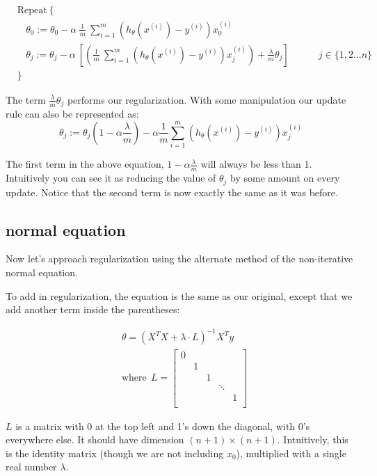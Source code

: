 \documentclass[10pt,a4paper,UTF8]{article}
\begin{document}
\begin{align*} & \text{Repeat}\ \lbrace \\ & \ \ \ \ \theta_0 := \theta_0 - \alpha\ \frac{1}{m}\ \sum_{i=1}^m (h_\theta(x^{(i)}) - y^{(i)})x_0^{(i)} \\ & \ \ \ \ \theta_j := \theta_j - \alpha\ \left[ \left( \frac{1}{m}\ \sum_{i=1}^m (h_\theta(x^{(i)}) - y^{(i)})x_j^{(i)} \right) + \frac{\lambda}{m}\theta_j \right] &\ \ \ \ \ \ \ \ \ \ j \in \lbrace 1,2...n\rbrace\\ & \rbrace \end{align*}

The term \(\frac{\lambda}{m}\theta_{j}\) performs our regularization. With some manipulation our update rule can also be represented as:
\begin{equation}
\label{eq:7}
\theta_j := \theta_j(1 - \alpha\frac{\lambda}{m}) - \alpha\frac{1}{m}\sum_{i=1}^m(h_\theta(x^{(i)}) - y^{(i)})x_j^{(i)}
\end{equation}

The first term in the above equation, \(1-\alpha\frac{\lambda}{m}\) will always be less than 1. Intuitively you can see it as reducing the value of \(\theta_{j}\) by some amount on every update. Notice that the second term is now exactly the same as it was before.

\subsection{normal equation}
\label{sec:org362b0f6}

Now let's approach regularization using the alternate method of the non-iterative normal equation.

To add in regularization, the equation is the same as our original, except that we add another term inside the parentheses:

\begin{align*}& \theta = \left( X^TX + \lambda \cdot L \right)^{-1} X^Ty \\& \text{where}\ \ L = \begin{bmatrix} 0 & & & & \\ & 1 & & & \\ & & 1 & & \\ & & & \ddots & \\ & & & & 1 \\\end{bmatrix}\end{align*}

\(L\) is a matrix with 0 at the top left and 1's down the diagonal, with 0's everywhere else. It should have dimension \((n+1)\times (n+1)\). Intuitively, this is the identity matrix (though we are not including \(x_{0}\)), multiplied with a single real number \(\lambda\).
\end{document}
